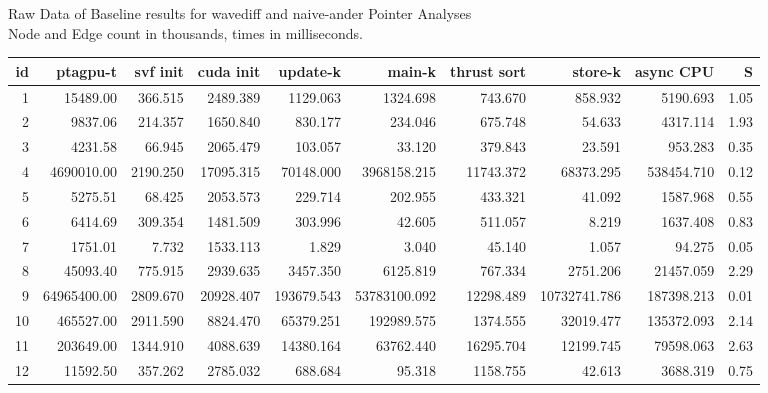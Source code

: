 \begin{table}[ht]
    \caption[Raw Data of Baseline results for wavediff and naive-ander Pointer Analyses]{Raw Data of Baseline results for wavediff and naive-ander Pointer Analyses\\Node and Edge count in thousands, times in milliseconds.}
\end{table}

\begin{table}[ht]
    \tiny
    \begin{tabular}{rrrrrrrrrr}
        \toprule
        id & ptagpu-t    & svf init & cuda init & update-k   & main-k       & thrust sort & store-k      & async CPU  & S    \\
        \midrule
        1  & 15489.00    & 366.515  & 2489.389  & 1129.063   & 1324.698     & 743.670     & 858.932      & 5190.693   & 1.05 \\
        2  & 9837.06     & 214.357  & 1650.840  & 830.177    & 234.046      & 675.748     & 54.633       & 4317.114   & 1.93 \\
        3  & 4231.58     & 66.945   & 2065.479  & 103.057    & 33.120       & 379.843     & 23.591       & 953.283    & 0.35 \\
        4  & 4690010.00  & 2190.250 & 17095.315 & 70148.000  & 3968158.215  & 11743.372   & 68373.295    & 538454.710 & 0.12 \\
        5  & 5275.51     & 68.425   & 2053.573  & 229.714    & 202.955      & 433.321     & 41.092       & 1587.968   & 0.55 \\
        6  & 6414.69     & 309.354  & 1481.509  & 303.996    & 42.605       & 511.057     & 8.219        & 1637.408   & 0.83 \\
        7  & 1751.01     & 7.732    & 1533.113  & 1.829      & 3.040        & 45.140      & 1.057        & 94.275     & 0.05 \\
        8  & 45093.40    & 775.915  & 2939.635  & 3457.350   & 6125.819     & 767.334     & 2751.206     & 21457.059  & 2.29 \\
        9  & 64965400.00 & 2809.670 & 20928.407 & 193679.543 & 53783100.092 & 12298.489   & 10732741.786 & 187398.213 & 0.01 \\
        10 & 465527.00   & 2911.590 & 8824.470  & 65379.251  & 192989.575   & 1374.555    & 32019.477    & 135372.093 & 2.14 \\
        11 & 203649.00   & 1344.910 & 4088.639  & 14380.164  & 63762.440    & 16295.704   & 12199.745    & 79598.063  & 2.63 \\
        12 & 11592.50    & 357.262  & 2785.032  & 688.684    & 95.318       & 1158.755    & 42.613       & 3688.319   & 0.75 \\

\end{tabular}
\end{table}
